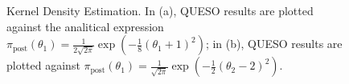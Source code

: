 \begin{figure}[htpb]
\centering 
{}
\vspace*{-10pt}
\caption{Kernel Density Estimation. In (a), QUESO results are plotted against the analitical expression $\pi_{\text{post}}(\theta_1)  =  \frac{1}{2\sqrt{2\pi}} \exp\left(-\frac{1}{8}(\theta_1+1)^2 \right)$; in (b), QUESO results are plotted against $\pi_{\text{post}}(\theta_1)  =  \frac{1}{ \sqrt{2\pi}} \exp\left(-\frac{1}{2}(\theta_2-2)^2 \right)$.}
\label{fig:simple_sip_kde}
\end{figure}



